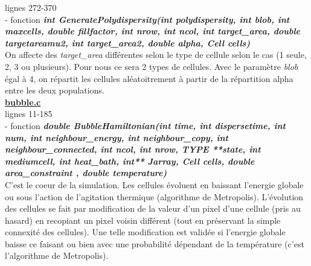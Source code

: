 \documentclass[11pt,a4paper]{article}
\begin{document}
lignes 272-370\\
- fonction \textbf{\textit{int GeneratePolydispersity(int polydispersity, int blob, int maxcells, double fillfactor, int nrow, int ncol, int target\_area, double targetareamu2, int target\_area2, double alpha, Cell cells)}}\\
On affecte des \textit{target\_area} différentes selon le type de cellule selon le cas (1 seule, 2, 3 ou plusieurs). Pour nous ce sera 2 types de cellules. Avec le paramètre \textit{blob} égal à 4, on répartit les cellules aléatoitrement à partir de la répartition alpha entre les deux populations.\\


\underline{\textbf{bubble.c}}\\

lignes 11-185\\
- fonction \textbf{\textit{double BubbleHamiltonian(int time, int dispersetime, int num, int neighbour\_energy, int neighbour\_copy, int neighbour\_connected, int ncol, int nrow, TYPE **state, int mediumcell, int heat\_bath, int** Jarray, Cell cells, double area\_constraint , double temperature)}}\\
C’est le coeur de la simulation. Les cellules évoluent en baissant l’energie globale ou sous l’action de l’agitation thermique (algorithme de Metropolis). L’évolution des cellules se fait par modification de la valeur d’un pixel d’une cellule (pris au hasard) en recopiant un pixel voisin différent (tout en préservant la simple connexité des cellules). Une telle modification est validée si l’energie globale baisse ce faisant ou bien avec une probabilité dépendant de la température (c’est l’algorithme de Metropolis).\\
\end{document}
